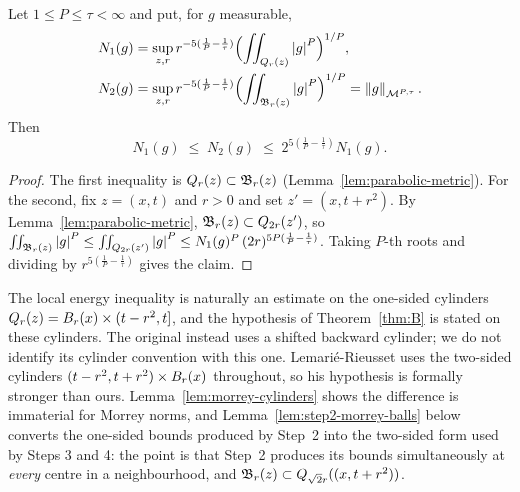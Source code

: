 \documentclass[11pt,reqno]{amsart}
\begin{document}
\begin{lemma}
\label{lem:morrey-cylinders}
Let $1\le P\le\tau<\infty$ and put, for $g$ measurable,
\[
\begin{aligned}
&N_{1}(g)=\sup_{z,r}r^{-5(\frac1P-\frac1\tau)}
    \Bigl(\iint_{Q_{r}(z)}\left\lvert g \right\rvert^{P}\Bigr)^{1/P},
  \\
 &  N_{2}(g)=\sup_{z,r}r^{-5(\frac1P-\frac1\tau)}
    \Bigl(\iint_{\mathfrak{B}_{r}(z)}\left\lvert g \right\rvert^{P}\Bigr)^{1/P}
   =\left\lVert g \right\rVert_{\mathcal{M}^{P,\tau}} .
\end{aligned}
\]
Then
\begin{equation}\label{eq:morrey-cyl}
  N_{1}(g)\;\le\;N_{2}(g)\;\le\;2^{5(\frac1P-\frac1\tau)}N_{1}(g).
\end{equation}
\end{lemma}

\begin{proof}
The first inequality is $Q_{r}(z)\subset\mathfrak{B}_{r}(z)$
(Lemma~\ref{lem:parabolic-metric}). For the second, fix $z=(x,t)$ and $r>0$
and set $z'=(x,t+r^{2})$. By Lemma~\ref{lem:parabolic-metric},
$\mathfrak{B}_{r}(z)\subset Q_{2r}(z')$, so
$\iint_{\mathfrak{B}_{r}(z)}\left\lvert g \right\rvert^{P}\le\iint_{Q_{2r}(z')}\left\lvert g \right\rvert^{P}
 \le N_{1}(g)^{P}\,(2r)^{5P(\frac1P-\frac1\tau)}$. Taking $P$-th roots and
dividing by $r^{5(\frac1P-\frac1\tau)}$ gives the claim.
\end{proof}

\begin{remark}
\label{rem:one-sided}
The local energy inequality is naturally an estimate on the one-sided cylinders
$Q_{r}(z)=B_{r}(x)\times(t-r^{2},t]$, and the hypothesis of
Theorem~\ref{thm:B} is stated on these cylinders. The original
\cite[Proposition 2]{CKN1982} instead uses a shifted backward cylinder;
we do not identify its cylinder convention with this one.
Lemarié-Rieusset \cite[\S13.8]{LemarieRieusset2016} uses the two-sided
cylinders $(t-r^{2},t+r^{2})\times B_{r}(x)$ throughout, so his hypothesis is
formally stronger than ours. Lemma~\ref{lem:morrey-cylinders} shows the
difference is immaterial for Morrey norms, and
Lemma~\ref{lem:step2-morrey-balls} below converts the one-sided bounds produced
by Step~2 into the two-sided form used by Steps 3 and 4: the point is that
Step~2 produces its bounds simultaneously at \emph{every} centre in a
neighbourhood, and $\mathfrak{B}_{r}(z)\subset Q_{\sqrt2 r}((x,t+r^{2}))$.
\end{remark}
\end{document}
